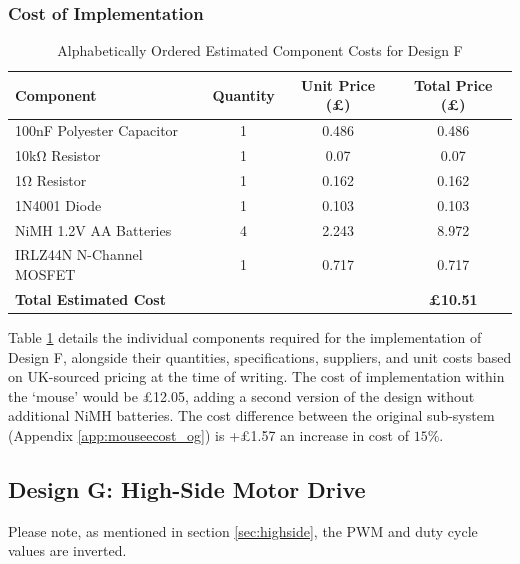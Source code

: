 \subsubsection{Cost of Implementation}

\begin{table}[H]
\centering
\caption{Alphabetically Ordered Estimated Component Costs for Design F}
\begin{tabular}{|l|c|c|c|}
\hline
\textbf{Component}                & \textbf{Quantity} & \textbf{Unit Price (£)} & \textbf{Total Price (£)}\\ \hline
100nF Polyester Capacitor\cite{rs_100nfcap_poly} & 1 & 0.486 & 0.486\\ \hline
10kΩ Resistor \cite{rs_10kresistor} & 1 & 0.07 & 0.07\\ \hline
1Ω Resistor \cite{rs_res1}& 1 & 0.162 & 0.162\\ \hline
1N4001 Diode \cite{rs_1n4001} & 1 & 0.103 & 0.103\\ \hline
NiMH 1.2V AA Batteries \cite{rs_nimh} & 4 & 2.243 & 8.972\\ \hline
IRLZ44N N-Channel MOSFET \cite{rs_irlz44n} & 1 & 0.717 & 0.717\\ \hline\hline
\textbf{Total Estimated Cost} &&&\textbf{£10.51}\\ \hline
\end{tabular}
\label{tab:cost_designf}
\end{table}

Table \ref{tab:cost_designf} details the individual components required for the implementation of Design F, alongside their quantities, specifications, suppliers, and unit costs based on UK-sourced pricing at the time of writing. The cost of implementation within the `mouse' would be £12.05, adding a second version of the design without additional NiMH batteries. The cost difference between the original sub-system (Appendix \ref{app:mouseecost_og}) is +£1.57 an increase in cost of \(15\%\).
\newpage
\subsection{Design G: High-Side Motor Drive}

Please note, as mentioned in section \ref{sec:highside}, the PWM and duty cycle values are inverted.

